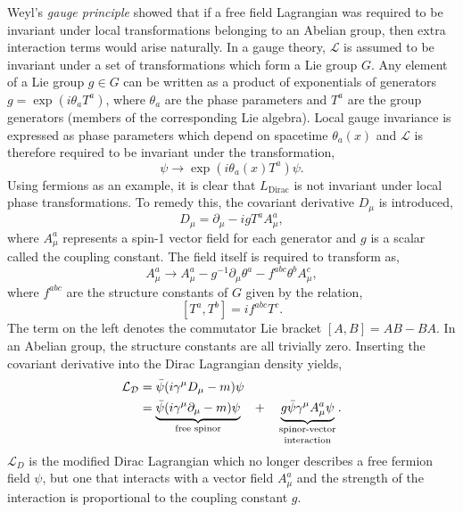 Weyl's \textit{gauge principle} showed that if a free field Lagrangian was required to be invariant under local transformations belonging to an Abelian group, then extra interaction terms would arise naturally.
In a gauge theory, $\mathcal{L}$ is assumed to be invariant under a set of transformations which form a Lie group $G$.
Any element of a Lie group $g \in G$ can be written as a product of exponentials of generators $g = \exp(i \theta_a T^a)$, where $\theta_a$ are the phase parameters and $T^a$ are the group generators (members of the corresponding Lie algebra).
Local gauge invariance is expressed as phase parameters which depend on spacetime $\theta_a(x)$ and $\mathcal{L}$ is therefore required to be invariant under the transformation,
\begin{equation}
	\label{eq:local_gauge_invariance}
	\psi \rightarrow \exp\left(i \theta_a(x) T^a\right) \psi.
\end{equation}
Using fermions as an example, it is clear that $L_\text{Dirac}$ is not invariant under local phase transformations.
To remedy this, the covariant derivative $D_\mu$ is introduced,
\begin{equation}
	\label{eq:covariant_derivative}
	D_\mu = \partial_\mu - i g T^a A_\mu^a,
\end{equation}
where $A_\mu^a$ represents a spin-1 vector field for each generator and $g$ is a scalar called the coupling constant.
The field itself is required to transform as,
\begin{equation}
	\label{eq:gauge_transformation}
	A_\mu^a \rightarrow A_\mu^a - g^{-1} \partial_\mu \theta^a - f^{abc} \theta^b A_\mu^c,
\end{equation}
where $f^{abc}$ are the structure constants of $G$ given by the relation,
\begin{equation}
	\label{eq:structure_constants}
	[T^a, T^b] = i f^{abc} T^c.
\end{equation}
The term on the left denotes the commutator Lie bracket $[A, B] = AB - BA$.
In an Abelian group, the structure constants are all trivially zero.
Inserting the covariant derivative into the Dirac Lagrangian density yields,
\begin{align}
	\label{eq:dirac_lagrangian_gauge}
	\mathcal{L_D} & = \bar \psi (i \gamma^\mu D_\mu - m) \psi                                                                                                                                       \\
	              & = \underbrace{\bar \psi (i \gamma^\mu \partial_\mu - m) \psi}_\text{free spinor} \quad + \quad \underbrace{g \bar \psi \gamma^\mu A_\mu^a \psi}_\text{\shortstack{spinor-vector \\interaction}}.
\end{align}
$\mathcal{L}_D$ is the modified Dirac Lagrangian which no longer describes a free fermion field $\psi$, but one that interacts with a vector field $A_\mu^a$ and the strength of the interaction is proportional to the coupling constant $g$.

